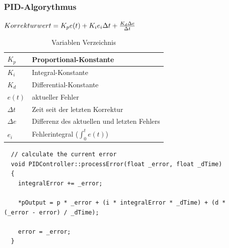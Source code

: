 \subsubsection{PID-Algorythmus}
\begin{minipage}[l]{0.5\textwidth}
  \begin{math}
    Korrekturwert = K_p e(t) + K_i e_i \Delta{t} + \frac{K_d \Delta{e}}{\Delta{t}} \\
  \end{math} 
\end{minipage}
\begin{minipage}[r]{0.49\textwidth}
  \begin{table}[H]
    \centering
  \settowidth{}
  \setlength\extrarowheight{2pt}
  \begin{tabulary}{1.0\textwidth}{|L|L|}
    \hline
    \begin{math} K_p \end{math} & Proportional-Konstante\\
    \hline
    \begin{math} K_i \end{math} & Integral-Konstante\\
    \hline
    \begin{math} K_d \end{math} & Differential-Konstante\\
    \hline
    \begin{math} e(t) \end{math} & aktueller Fehler\\
    \hline
    \begin{math} \Delta{t} \end{math} & Zeit seit der letzten Korrektur\\
    \hline
    \begin{math} \Delta{e} \end{math} & Differenz des aktuellen und letzten Fehlers\\
    \hline
    \begin{math} e_i \end{math} & Fehlerintegral (\begin{math} \int_{0}^t e(t) \end{math})\\
    \hline
  \end{tabulary}
  \caption{Variablen Verzeichnis}
\end{table}
\end{minipage}

\vspace{3mm}
\begin{lstlisting}
  // calculate the current error
  void PIDController::processError(float _error, float _dTime)
  {
    integralError += _error;
  
    *pOutput = p * _error + (i * integralError * _dTime) + (d * (_error - error) / _dTime);
    
    error = _error;
  }  
  \end{lstlisting}